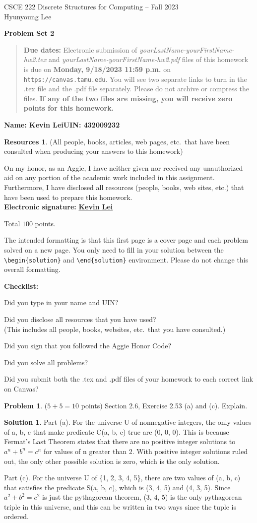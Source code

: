 \documentclass{article}
\theoremstyle{definition}
\newtheorem{problem}{Problem}
\newtheorem*{solution}{Solution}
\newtheorem*{resources}{Resources}
\newcommand{\name}[2]{\noindent\textbf{Name: #1}\hfill \textbf{UIN: #2}
  \newcommand{\myName}{#1}
  \newcommand{\myUIN}{#2}
}
\newcommand{\honor}{\noindent On my honor, as an Aggie, I have neither
  given nor received any unauthorized aid on any portion of the
  academic work included in this assignment. Furthermore, I have
  disclosed all resources (people, books, web sites, etc.) that have
  been used to prepare this homework. \\[2ex]
 \textbf{Electronic signature:} \underline{ \textbf{Kevin Lei} } } %
\newcommand{\checklist}{\noindent\textbf{Checklist:}
\begin{compactitem}[$\Box$] 
\item Did you type in your name and UIN? 
\item Did you disclose all resources that you have used? \\
(This includes all people, books, websites, etc.\ that you have consulted.)
\item Did you sign that you followed the Aggie Honor Code? 
\item Did you solve all problems? 
\item Did you submit both the .tex and .pdf files of your homework to each correct link on Canvas? 
\end{compactitem}
}
\newcommand{\problemset}[1]{\begin{center}\textbf{Problem Set #1}\end{center}}
\newcommand{\duedate}[1]{\begin{quote}\textbf{Due dates:} Electronic
    submission of \textsl{yourLastName-yourFirstName-hw2.tex} and 
    \textsl{yourLastName-yourFirstName-hw2.pdf} files of this homework is due on
    \textbf{#1} on \texttt{https://canvas.tamu.edu}. You will see two separate links
    to turn in the .tex file and the .pdf file separately. Please do not archive or compress the files.  
    \textbf{If any of the two files are missing, you will receive zero points for this homework.}\end{quote} }
\begin{document}
\begin{center}
{\large
CSCE 222 Discrete Structures for Computing -- Fall 2023\\[.5ex]
Hyunyoung Lee\\}
\end{center}
\problemset{2}
\duedate{Monday, 9/18/2023 11:59 p.m.}
\name{Kevin Lei}{432009232}  %

\begin{resources} (All people, books, articles, web pages, etc.\ that
  have been consulted when producing your answers to this homework)
\end{resources}
\honor

\bigskip

\noindent
Total $100$ points.

\bigskip

\noindent
The intended formatting is that this first page is a cover page and each 
problem solved on a new page. You only need to fill in your solution between 
the \verb|\begin{solution}| and \verb|\end{solution}| environment.  
Please do not change this overall formatting.

\vfill
\checklist

\newpage
\begin{problem} ($5+5=10$ points) Section 2.6, Exercise 2.53 (a) and (c). Explain.
\end{problem}
\begin{solution} 
Part (a). For the universe U of nonnegative integers, the only values of a, b, c that make predicate C(a, b, c) true are (0, 0, 0). 
This is because Fermat's Last Theorem states that there are no positive integer solutions to $a^{n} + b^{n} = c^{n}$ for values of n greater than 2. 
With positive integer solutions ruled out, the only other possible solution is zero, which is the only solution.

Part (c). For the universe U of \{1, 2, 3, 4, 5\}, there are two values of (a, b, c) that satisfies the predicate S(a, b, c), which is (3, 4, 5) and (4, 3, 5).
Since $a^{2} + b^{2} = c^{2}$ is just the pythagorean theorem, (3, 4, 5) is the only pythagorean triple in this universe, and this can be written in two ways since the tuple is ordered.
\end{solution}
\end{document}
